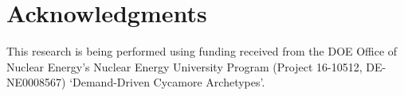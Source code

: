 \section{Acknowledgments}
This research is being performed using funding received from the DOE Office of Nuclear Energy's
Nuclear Energy University Program (Project 16-10512, DE-NE0008567) `Demand-Driven Cycamore Archetypes'.
